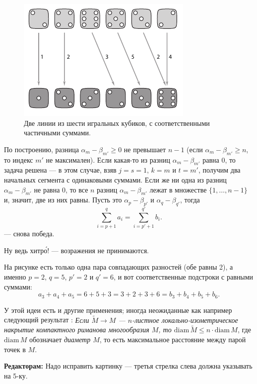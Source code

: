 \begin{figure}[ht!]
\centering
\includegraphics[scale=1]{pics/kubiki}
\caption{Две линии из шести игральных кубиков, с соответственными частичными суммами.}
\label{pic:kubiki}
\end{figure}

По построению, разница $\alpha_m-\beta_{m'}\ge 0$ не превышает $n-1$ 
(если $\alpha_m-\beta_{m'}\ge n$, то индекс $m'$ не максимален).
Если какая-то из разниц $\alpha_m-\beta_{m'}$ равна $0$, то задача решена --- в этом случае, взяв $j=s=1$, $k=m$ и $t=m'$, получим два начальных сегмента с одинаковыми суммами.
Если же ни одна из разниц $\alpha_m-\beta_{m'}$ не равна $0$, то все $n$ разниц 
$\alpha_m-\beta_{m'}$ лежат в множестве $\{1,\dots,n-1\}$ и, значит, две из них равны.
Пусть это $\alpha_p-\beta_{p'}$ и $\alpha_q-\beta_{q'}$, тогда 
\[\sum_{i=p+1}^qa_i=\sum_{i=p'+1}^{q'}b_i.\]
--- снова победа.

Ну ведь хитр\'{о}! --- возражения не принимаются.

На рисунке есть только одна пара совпадающих разностей (обе равны 2), а именно $p=2$, $q=5$, $p'=2$ и $q'=6$, и
вот соответственные подстроки с равными суммами:
\[a_3+a_4+a_5=6+5+3=3+2+3+6=b_3+b_4+b_5+b_6.\]

\begin{addedbytheeditors}
У этой идеи есть и другие применения; иногда неожиданные как например следующий результат \cite{petrunin}:
\textit{Если $\tilde M\to M$ --- $n$-листное локально-изометрическое накрытие компактного риманова многообразия $M$, то $\mathrm{diam}\, \tilde M\le n\cdot \mathrm{diam}\, M$}, где $\mathrm{diam}\, M$ обозначает \textit{диаметр $M$}, то есть максимальное расстояние между парой точек в $M$.

\textbf{Редакторам:} Надо исправить картинку --- третья стрелка слева должна указывать на 5-ку. 
\end{addedbytheeditors}
